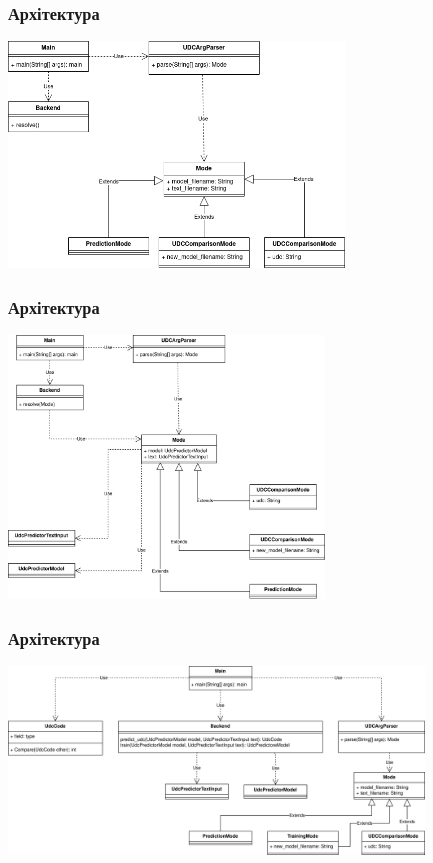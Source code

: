 \documentclass{beamer}
\begin{document}
\begin{frame}
	\frametitle{Архітектура}
	\begin{center}
		\includegraphics[height=6cm]{io_uml4.drawio.png}
	\end{center}
\end{frame}

\begin{frame}
	\frametitle{Архітектура}
	\begin{center}
		\includegraphics[height=7cm]{io_uml5.drawio.png}
	\end{center}
\end{frame}

\begin{frame}
	\frametitle{Архітектура}
	\begin{center}
		\includegraphics[height=5cm]{io_uml6.drawio.png}
	\end{center}
\end{frame}
\end{document}
